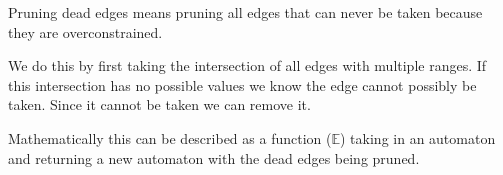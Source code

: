 Pruning dead edges means pruning all edges that can never be taken because they are overconstrained.

We do this by first taking the intersection of all edges with multiple ranges.
If this intersection has no possible values we know the edge cannot possibly be taken.
Since it cannot be taken we can remove it.

Mathematically this can be described as a function ($\mathbb{E}$) taking in an automaton and returning a new automaton with the dead edges being pruned.

